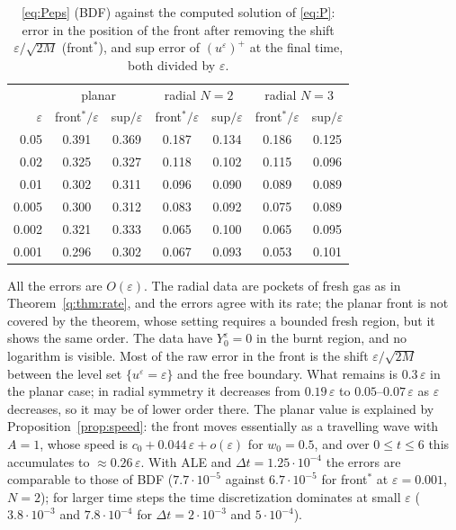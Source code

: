 \documentclass[11pt]{amsart}
\theoremstyle{definition}
\theoremstyle{remark}
\newcommand{\ve}{\varepsilon}
\begin{document}
\begin{table}[ht]
\centering
\small
\begin{tabular}{r cc cc cc}
\toprule
& \multicolumn{2}{c}{planar} & \multicolumn{2}{c}{radial $N=2$} & \multicolumn{2}{c}{radial $N=3$}\\
$\ve$ & front$^*/\ve$ & sup$/\ve$ & front$^*/\ve$ & sup$/\ve$ & front$^*/\ve$ & sup$/\ve$\\
\midrule
0.05  & 0.391 & 0.369 & 0.187 & 0.134 & 0.186 & 0.125\\
0.02  & 0.325 & 0.327 & 0.118 & 0.102 & 0.115 & 0.096\\
0.01  & 0.302 & 0.311 & 0.096 & 0.090 & 0.089 & 0.089\\
0.005 & 0.300 & 0.312 & 0.083 & 0.092 & 0.075 & 0.089\\
0.002 & 0.321 & 0.333 & 0.065 & 0.100 & 0.065 & 0.095\\
0.001 & 0.296 & 0.302 & 0.067 & 0.093 & 0.053 & 0.101\\
\bottomrule
\end{tabular}
\caption{\eqref{eq:Peps} (BDF) against the computed solution of \eqref{eq:P}: error in the
position of the front after removing the shift $\ve/\sqrt{2M}$ (front$^*$), and sup error
of $(u^\ve)^+$ at the final time, both divided by $\ve$.}\label{tab:limit}
\end{table}

All the errors are $O(\ve)$. The radial data are pockets of fresh gas as in
Theorem~\ref{q:thm:rate}, and the errors agree with its rate; the planar front is not
covered by the theorem, whose setting requires a bounded fresh region, but it shows the
same order. The data have
$Y_0^\ve=0$ in the burnt region, and no logarithm is visible. Most of the raw error in the
front is the shift $\ve/\sqrt{2M}$ between the level set $\{u^\ve=\ve\}$ and the free
boundary. What remains is $0.3\,\ve$ in the planar case; in radial symmetry it decreases from
$0.19\,\ve$ to $0.05$--$0.07\,\ve$ as $\ve$ decreases, so it may be of lower order there. The planar value is explained by Proposition~\ref{prop:speed}: the
front moves essentially as a travelling wave with $A=1$, whose speed is
$c_0+0.044\,\ve+o(\ve)$ for $w_0=0.5$, and over $0\le t\le6$ this accumulates to
$\approx0.26\,\ve$. With ALE and $\Delta t=1.25\cdot10^{-4}$ the errors are comparable to those of
BDF ($7.7\cdot10^{-5}$ against $6.7\cdot10^{-5}$ for front$^*$ at $\ve=0.001$, $N=2$); for larger
time steps the time discretization dominates at small $\ve$ ($3.8\cdot10^{-3}$ and
$7.8\cdot10^{-4}$ for $\Delta t=2\cdot10^{-3}$ and $5\cdot10^{-4}$).
\end{document}
